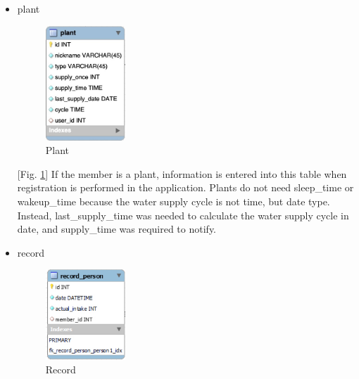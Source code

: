 \documentclass[conference]{IEEEtran}
\begin{document}
\begin{itemize}
\begin{enumerate}
\begin{itemize}
            [Fig. \ref{fig:db_pet}] When a member is a person, information enters this table when the application registers. In the personal table, there are nickname, weight, sleep\_time, wakeup\_time, intake\_goal, take\_once, temperature, and cycle. Nickname is the name of a member, and is displayed on the main screen and the specification screen. Weight is used to calculate intake\_goal. Wakeup\_time, bed\_time, and cycle are used to calculate the notification time and intake\_ounce. Temperature is used to send queries to water purifiers. This table receives the user's id as a foreign key.
            \item plant
            \setlength{\parindent}{2ex}
            \par \begin{figure}[h!]
            \includegraphics[width=3cm]{image/db_plant.jpg}
            \centering
            \caption{Plant}
            \label{fig:db_plant}
            \end{figure}
            
            [Fig. \ref{fig:db_plant}] If the member is a plant, information is entered into this table when registration is performed in the application. Plants do not need sleep\_time or wakeup\_time because the water supply cycle is not time, but date type. Instead, last\_supply\_time was needed to calculate the water supply cycle in date, and supply\_time was required to notify.
            \item record
            \setlength{\parindent}{2ex}
            \par \begin{figure}[h!]
            \includegraphics[width=3cm]{image/db_record.jpg}
            \centering
            \caption{Record}
            \label{fig:db_record}
            \end{figure}
            

\end{itemize}
\end{enumerate}
\end{itemize}
\end{document}
